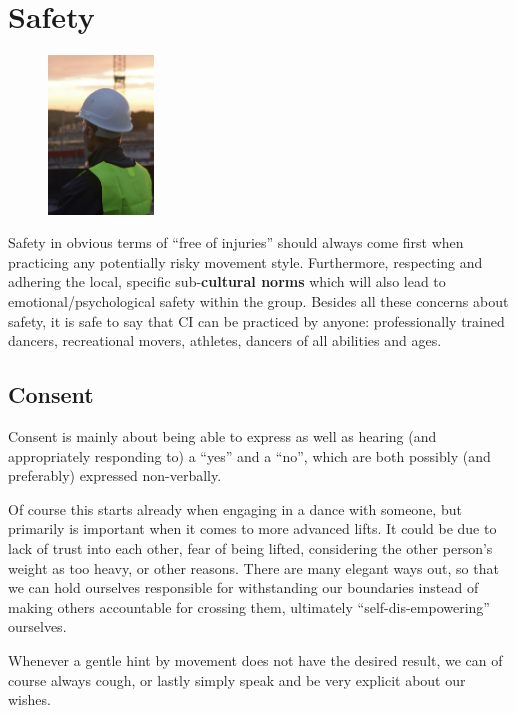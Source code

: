 \section{Safety}\label{sec:safety}

\begin{figure}
    \centering
    \includegraphics[width=0.25\textwidth]{images/safety}
\end{figure}

Safety in obvious terms of ``free of injuries'' should always come first when practicing any potentially risky movement style.
Furthermore, respecting and adhering the local, specific sub-\textbf{cultural norms} which will also lead to emotional/psychological safety within the group.
Besides all these concerns about safety, it is safe to say that CI can be practiced by anyone: professionally trained dancers, recreational movers, athletes, dancers of all abilities and ages.

\subsection{Consent}\label{subsec:consent}

Consent is mainly about being able to express as well as hearing (and appropriately responding to) a ``yes'' and a ``no'', which are both possibly (and preferably) expressed non-verbally.

Of course this starts already when engaging in a dance with someone, but primarily is important when it comes to more advanced lifts.
It could be due to lack of trust into each other, fear of being lifted, considering the other person's weight as too heavy, or other reasons.
There are many elegant ways out, so that we can hold ourselves responsible for withstanding our boundaries instead of making others accountable for crossing them, ultimately ``self-dis-empowering'' ourselves.

Whenever a gentle hint by movement does not have the desired result, we can of course always cough, or lastly simply speak and be very explicit about our wishes.

